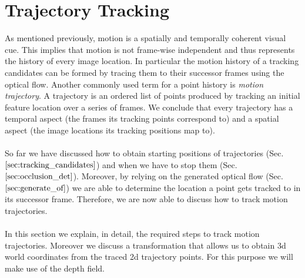 \section{Trajectory Tracking}
\label{sec:trajectory_tracking}
As mentioned previously, motion is a spatially and temporally coherent visual cue. This implies that motion is not frame-wise independent and thus represents the history of every image location. In particular the motion history of a tracking candidates can be formed by tracing them to their successor frames using the optical flow. Another commonly used term for a point history is \textit{motion trajectory}. A trajectory is an ordered list of points produced by tracking an initial feature location over a series of frames. We conclude that every trajectory has a temporal aspect (the frames its tracking points correspond to) and a spatial aspect (the image locations its tracking positions map to). \\ \\
So far we have discussed how to obtain starting positions of trajectories (Sec. $\ref{sec:tracking_candidates}$) and when we have to stop them (Sec. $\ref{sec:occlusion_det}$). Moreover, by relying on the generated optical flow (Sec. $\ref{sec:generate_of}$) we are able to determine the location a point gets tracked to in its successor frame. Therefore, we are now able to discuss how to track motion trajectories. \\ \\
In this section we explain, in detail, the required steps to track motion trajectories. Moreover we discuss a transformation that allows us to obtain 3d world coordinates from the traced 2d trajectory points. For this purpose we will make use of the depth field.

